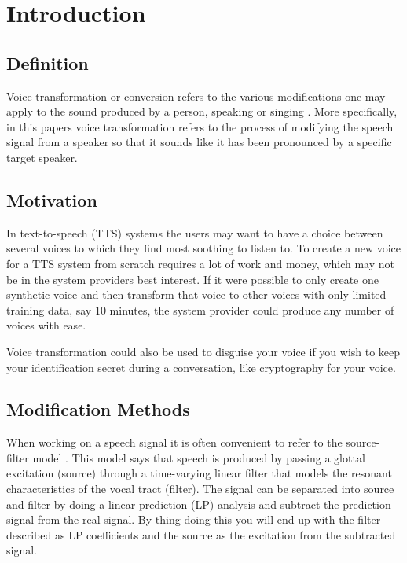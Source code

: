 \chapter{Introduction} %
\label{cha:introduction}
  

\section{Definition} %
\label{sec:definition}
Voice transformation or conversion refers to the various modifications one may apply to the sound produced by a person, speaking or singing \cite{stylianou08}. More specifically, in this papers voice transformation refers to the process of modifying the speech signal from a speaker so that it sounds like it has been pronounced by a specific target speaker. 

\section{Motivation} %
\label{sec:motivation}
In text-to-speech (TTS) systems the users may want to have a choice between several voices to which they find most soothing to listen to. To create a new voice for a TTS system from scratch requires a lot of work and money, which may not be in the system providers best interest. If it were possible to only create one synthetic voice and then transform that voice to other voices with only limited training data, say 10 minutes, the system provider could produce any number of voices with ease. 

Voice transformation could also be used to disguise your voice if you wish to keep your identification secret during a conversation, like cryptography for your voice. 

\section{Modification Methods} %
\label{sec:synthesis_methods}
When working on a speech signal it is often convenient to refer to the source-filter model \cite{taletek}. This model says that speech is produced by passing a glottal excitation (source) through a time-varying linear filter that models the resonant characteristics of the vocal tract (filter). The signal can be separated into source and filter by doing a linear prediction (LP) analysis and subtract the prediction signal from the real signal. By thing doing this you will end up with the filter described as LP coefficients and the source as the excitation from the subtracted signal.

